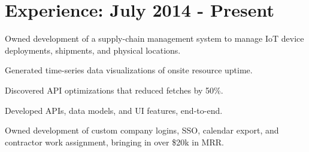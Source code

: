 \documentclass[]{deedy-resume-openfont}
\begin{document}
\begin{minipage}[t]{0.66\textwidth}


\section{Experience: July 2014 - Present}
\sectionsep

\vspace{\topsep}
\begin{tightemize}

\item Owned development of a supply-chain management system to manage IoT device deployments, shipments, and physical locations.
\item Generated time-series data visualizations of onsite resource uptime.
\item Discovered API optimizations that reduced fetches by 50\%.

\end{tightemize}
\sectionsep


\begin{tightemize}


\item Developed APIs, data models, and UI features, end-to-end.
\item Owned development of custom company logins, SSO, calendar export, and contractor work assignment, bringing in over \$20k in MRR.

\end{tightemize}
\sectionsep

\begin{tightemize}


\end{tightemize}
\end{minipage}
\end{document}
